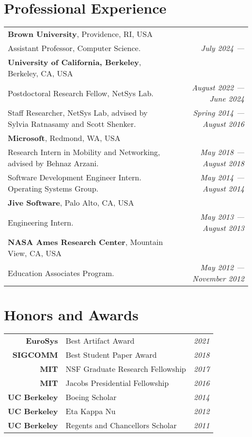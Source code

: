 \section{Professional Experience}
\begin{tabular*}{\textwidth}{@{\hspace{1cm}}l@{\extracolsep{\fill}}r@{}}
\textbf{Brown University}, Providence, RI, USA  &\\
Assistant Professor, Computer Science. & \emph{July 2024 ---} \\
%
\noindent \textbf{University of California, Berkeley}, Berkeley, CA, USA &\\
Postdoctoral Research Fellow, NetSys Lab. & \emph{August 2022 --- June 2024} \\
Staff Researcher, NetSys Lab, advised by Sylvia Ratnasamy and Scott Shenker. & \emph{Spring 2014 --- August 2016}\\
%
\textbf{Microsoft}, Redmond, WA, USA &\\
Research Intern in Mobility and Networking, advised by Behnaz Arzani. & \emph{May 2018 --- August 2018} \\
Software Development Engineer Intern. Operating Systems Group. & \emph{May 2014 --- August 2014}\\
%
\textbf{Jive Software}, Palo Alto, CA, USA &\\
Engineering Intern. & \emph{May 2013 --- August 2013}\\
%
\textbf{NASA Ames Research Center}, Mountain View, CA, USA &\\
Education Associates Program. & \emph{May 2012 --- November 2012}\\
\end{tabular*}

\section{Honors and Awards}
\begin{tabular*}{\textwidth}{@{\hspace{1cm}}r@{\hspace{5pt}}l@{\extracolsep{\fill}}r@{}}
\textbf{EuroSys}     & Best Artifact Award              & \emph{2021} \\
\textbf{SIGCOMM}     & Best Student Paper Award         & \emph{2018} \\
\textbf{MIT}         & NSF Graduate Research Fellowship & \emph{2017} \\
\textbf{MIT}         & Jacobs Presidential Fellowship   & \emph{2016} \\
\textbf{UC Berkeley} & Boeing Scholar                   & \emph{2014} \\
\textbf{UC Berkeley} & Eta Kappa Nu                     & \emph{2012} \\
\textbf{UC Berkeley} & Regents and Chancellors Scholar  & \emph{2011} \\
\end{tabular*}
